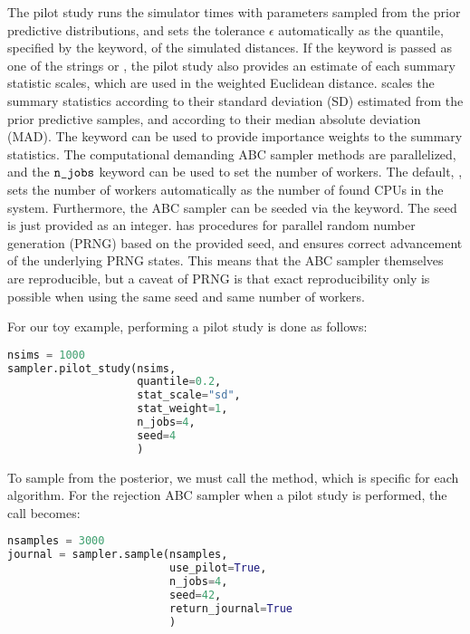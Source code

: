 The pilot study runs the simulator  times with parameters sampled from the prior predictive distributions, and sets the tolerance $\epsilon$ automatically as the quantile, specified by the  keyword, of the simulated distances. If the  keyword is passed as one of the strings  or , the pilot study also provides an estimate of each summary statistic scales, which are used in the weighted Euclidean distance.  scales the summary statistics according to their standard deviation (SD) estimated from the prior predictive samples, and  according to their median absolute deviation (MAD). The  keyword can be used to provide importance weights to the summary statistics. The computational demanding ABC sampler methods are parallelized, and the $\cw{n_jobs}$ keyword can be used to set the number of workers. The default, , sets the number of workers automatically as the number of found CPUs in the system. Furthermore, the ABC sampler can be seeded via the  keyword. The seed is just provided as an integer.  has procedures for parallel random number generation (PRNG) based on the provided seed, and ensures correct advancement of the underlying PRNG states. This means that the ABC sampler themselves are reproducible, but a caveat of PRNG is that exact reproducibility only is possible when using the same seed and same number of workers. 

For our toy example, performing a pilot study is done as follows: 

\begin{lstlisting}[language=python]
nsims = 1000
sampler.pilot_study(nsims,
                    quantile=0.2,
                    stat_scale="sd",
                    stat_weight=1,
                    n_jobs=4,
                    seed=4
                    )
\end{lstlisting}

To sample from the posterior, we must call the  method, which is specific for each algorithm. For the rejection ABC sampler when a pilot study is performed, the call becomes: 

\begin{lstlisting}[language=python]
nsamples = 3000
journal = sampler.sample(nsamples,
                         use_pilot=True,
                         n_jobs=4,
                         seed=42,
                         return_journal=True
                         )
\end{lstlisting}

